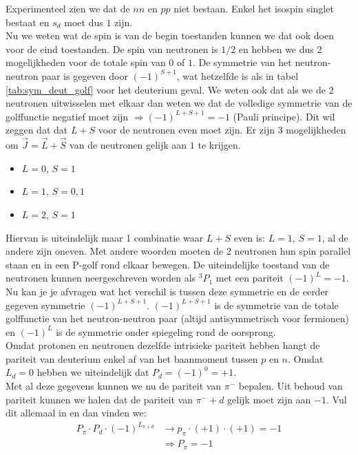 \documentclass[../main.tex]{subfiles}
\begin{document}
Experimenteel zien we dat de $nn$ en $pp$ niet bestaan. Enkel het isospin singlet bestaat en $s_d$ moet dus $1$ zijn.\\
Nu we weten wat de spin is van de begin toestanden kunnen we dat ook doen voor de eind toestanden. De spin van neutronen is $1/2$ en hebben we dus 2 mogelijkheden voor de totale spin van $0$ of $1$. De symmetrie van het neutron-neutron paar is gegeven door $(-1)^{S+1}$, wat hetzelfde is als in tabel \ref{tab:sym_deut_golf} voor het deuterium geval. We weten ook dat als we de 2 neutronen uitwisselen met elkaar dan weten we dat de volledige symmetrie van de golffunctie negatief moet zijn $\Rightarrow (-1)^{L+S+1}=-1$ (Pauli principe). Dit wil zeggen dat dat $L+S$ voor de neutronen even moet zijn. Er zijn 3 mogelijkheden om $\vec{J}=\vec{L}+\vec{S}$ van de neutronen gelijk aan $1$ te krijgen.
\begin{itemize}
    \item $L=0$, $S=1$
    \item $L=1$, $S=0,1$
    \item $L=2$, $S=1$
\end{itemize}
Hiervan is uiteindelijk maar 1 combinatie waar $L+S$ even is: $L=1$, $S=1$, al de andere zijn oneven. Met andere woorden moeten de 2 neutronen hun spin parallel staan en in een P-golf rond elkaar bewegen. De uiteindelijke toestand van de neutronen kunnen neergeschreven worden als $^3P_1$ met een pariteit $(-1)^L = -1$. Nu kan je je afvragen wat het verschil is tussen deze symmetrie en de eerder gegeven symmetrie $(-1)^{L+S+1}$. $(-1)^{L+S+1}$ is de symmetrie van de totale golffunctie van het neutron-neutron paar (altijd antisymmetrisch voor fermionen) en $(-1)^L$ is de symmetrie onder spiegeling rond de oorsprong.\\
Omdat protonen en neutronen dezelfde intrisieke pariteit hebben hangt de pariteit van deuterium enkel af van het baanmoment tussen $p$ en $n$. Omdat $L_d=0$ hebben we uiteindelijk dat $P_d=(-1)^0=+1$.\\
Met al deze gegevens kunnen we nu de pariteit van $\pi^-$ bepalen. Uit behoud van pariteit kunnen we halen dat de pariteit van $\pi^-+d$ gelijk moet zijn aan $-1$. Vul dit allemaal in en dan vinden we:
\begin{equation}
    \begin{aligned}
        \label{eq:par_pi_-}
        P_\pi\cdot P_d\cdot (-1)^{L_{\pi+d}} &\rightarrow p_\pi\cdot (+1) \cdot (+1) = -1\\
                                             &\Rightarrow P_\pi=-1
    \end{aligned}
\end{equation}
\end{document}

